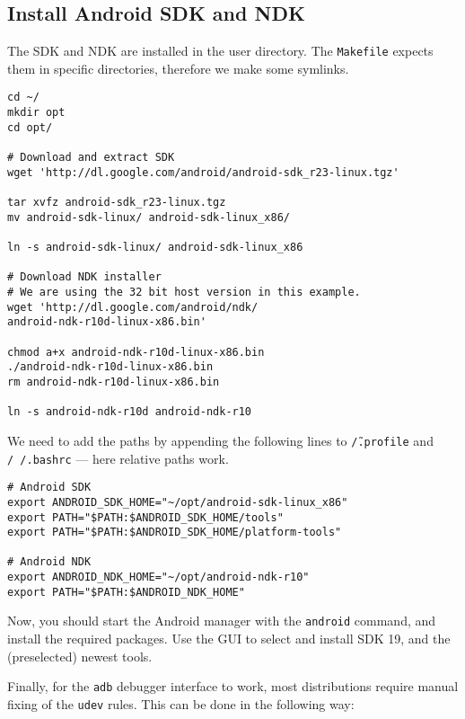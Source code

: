 \subsection{Install Android SDK and NDK}

The SDK and NDK are installed in the user directory. The \texttt{Makefile} expects them in specific directories, therefore we make some symlinks.

\begin{verbatim}
cd ~/
mkdir opt
cd opt/

# Download and extract SDK
wget 'http://dl.google.com/android/android-sdk_r23-linux.tgz'

tar xvfz android-sdk_r23-linux.tgz
mv android-sdk-linux/ android-sdk-linux_x86/

ln -s android-sdk-linux/ android-sdk-linux_x86

# Download NDK installer
# We are using the 32 bit host version in this example.
wget 'http://dl.google.com/android/ndk/
android-ndk-r10d-linux-x86.bin'

chmod a+x android-ndk-r10d-linux-x86.bin
./android-ndk-r10d-linux-x86.bin
rm android-ndk-r10d-linux-x86.bin

ln -s android-ndk-r10d android-ndk-r10
\end{verbatim}

We need to add the paths by appending the following lines to \texttt{\~/.profile} and \texttt{/~/.bashrc} --- here relative paths work.

\begin{verbatim}
# Android SDK
export ANDROID_SDK_HOME="~/opt/android-sdk-linux_x86"
export PATH="$PATH:$ANDROID_SDK_HOME/tools"
export PATH="$PATH:$ANDROID_SDK_HOME/platform-tools"

# Android NDK
export ANDROID_NDK_HOME="~/opt/android-ndk-r10"
export PATH="$PATH:$ANDROID_NDK_HOME"
\end{verbatim}

Now, you should start the Android manager with the \texttt{android} command, and install the required packages. Use the GUI to select and install SDK 19, and the (preselected) newest tools.

Finally, for the \texttt{adb} debugger interface to work, most distributions require manual fixing of the \texttt{udev} rules. This can be done in the following way:

